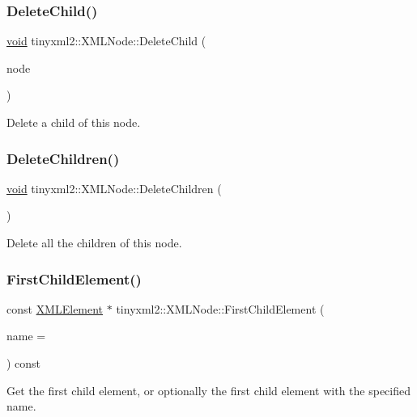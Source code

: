 \subsubsection{\texorpdfstring{Delete\+Child()}{DeleteChild()}}
{\footnotesize\ttfamily \hyperlink{interfacevoid}{void} tinyxml2\+::\+X\+M\+L\+Node\+::\+Delete\+Child (\begin{DoxyParamCaption}\item[{\hyperlink{classtinyxml2_1_1_x_m_l_node}{X\+M\+L\+Node} $\ast$}]{node }\end{DoxyParamCaption})}

Delete a child of this node. \mbox{\label{classtinyxml2_1_1_x_m_l_node_a0360085cc54df5bff85d5c5da13afdce}} 
\subsubsection{\texorpdfstring{Delete\+Children()}{DeleteChildren()}}
{\footnotesize\ttfamily \hyperlink{interfacevoid}{void} tinyxml2\+::\+X\+M\+L\+Node\+::\+Delete\+Children (\begin{DoxyParamCaption}{ }\end{DoxyParamCaption})}

Delete all the children of this node. \mbox{\label{classtinyxml2_1_1_x_m_l_node_a1bec132dcf085284e0a10755f2cf0d57}} 
\subsubsection{\texorpdfstring{First\+Child\+Element()}{FirstChildElement()}}
{\footnotesize\ttfamily const \hyperlink{classtinyxml2_1_1_x_m_l_element}{X\+M\+L\+Element} $\ast$ tinyxml2\+::\+X\+M\+L\+Node\+::\+First\+Child\+Element (\begin{DoxyParamCaption}\item[{const char $\ast$}]{name = {} }\end{DoxyParamCaption}) const}

Get the first child element, or optionally the first child element with the specified name. \mbox{\label{classtinyxml2_1_1_x_m_l_node_a9275138a1b8dd5d8e2c26789bdc23ac8}} 
